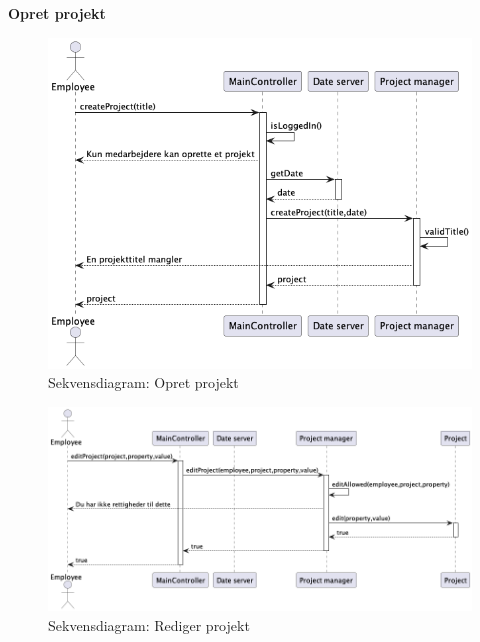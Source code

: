 \textbf{Opret projekt}
\begin{figure}[H]
    \centering
    \caption{Sekvensdiagram: Opret projekt}\label{fig:sequence_create_project}
    \includegraphics[width = .75\textwidth]{Diagrams/seq_create_project.png}
\end{figure}
\begin{figure}[H]
    \centering
    \caption{Sekvensdiagram: Rediger projekt}\label{fig:sequence_project_edit}
    \includegraphics[width = .75\textwidth]{Diagrams/seq_project_edit.png}
\end{figure}
